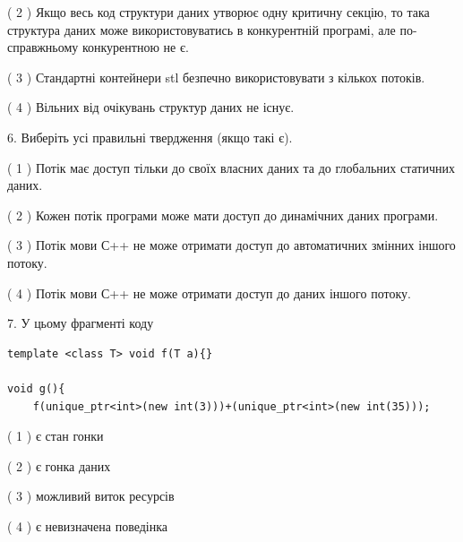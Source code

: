 \documentclass[12pt, ukrainian]{article}
\begin{document}
\begin {large}
{( 2 ) Якщо весь код структури даних утворює одну критичну секцію, то така структура даних може використовуватись в конкурентній програмі, але по-справжньо\-му конкурентною не є.%

( 3 ) Стандартні контейнери stl безпечно використовувати з кількох потоків.%

( 4 ) Вільних від очікувань структур даних не існує.%
\newpage



\vspace{5mm}
6. Виберіть усі правильні твердження (якщо такі є).\par
\vspace{2mm}

( 1 ) Потік має доступ тільки до своїх власних даних та до глобальних статичних даних.%

( 2 ) Кожен потік програми може мати доступ до динамічних даних програми.%

( 3 ) Потік мови С++ не може отримати доступ до автоматичних змінних іншого потоку.%

( 4 ) Потік мови С++ не може отримати доступ до даних іншого потоку.%


\vspace{5mm}
7. У цьому фрагменті коду
\begin{verbatim}
template <class T> void f(T a){}

void g(){
    f(unique_ptr<int>(new int(3)))+(unique_ptr<int>(new int(35)));
\end{verbatim}

( 1 ) є стан гонки%

( 2 ) є гонка даних%

( 3 ) можливий виток ресурсів%

( 4 ) є невизначена поведінка%
}
\end {large}
\end{document}
